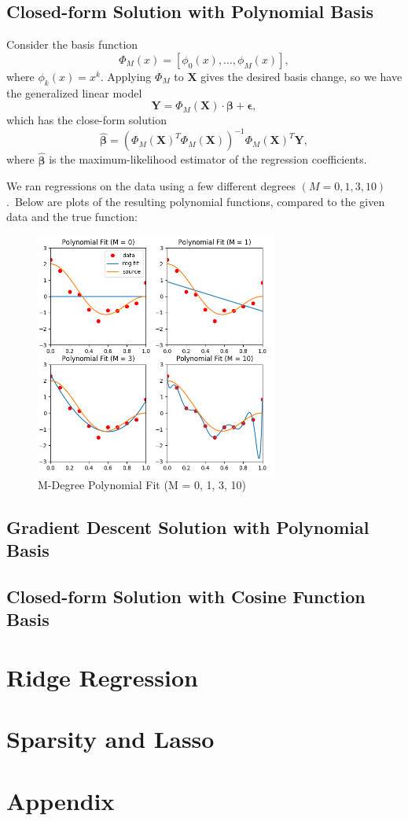 \documentclass[journal]{IEEEtran}
\begin{document}
\subsection{Closed-form Solution with Polynomial Basis}
Consider the basis function $$\Phi_M(x) = [\phi_0(x), \dots, \phi_M(x)],$$ where $\phi_k(x) = x^k$. Applying $\Phi_M$ to $\mathbf{X}$ gives the desired basis change, so we have the generalized linear model $$\mathbf Y = \Phi_M(\mathbf X) \cdot \bm \beta + \bm \epsilon,$$ which has the close-form solution $$\hat{\bm \beta} = (\Phi_M(\mathbf X)^T \Phi_M(\mathbf X))^{-1} \Phi_M(\mathbf X)^T \mathbf Y,$$
where $\hat{\bm \beta}$ is the maximum-likelihood estimator of the regression coefficients.

We ran regressions on the data using a few different degrees $(M = 0, 1, 3, 10)$.\footnotemark\ Below are plots of the resulting polynomial functions, compared to the given data and the true function:


\begin{figure}[H]
  \centering
  \includegraphics[width = 3.15in]{../P2/fig/part_1.png}
  \caption{M-Degree Polynomial Fit (M = 0, 1, 3, 10)}
\end{figure}

\subsection{Gradient Descent Solution with Polynomial Basis}

\subsection{Closed-form Solution with Cosine Function Basis}

\section{Ridge Regression}

\section{Sparsity and Lasso}

\section{Appendix}
\end{document}

